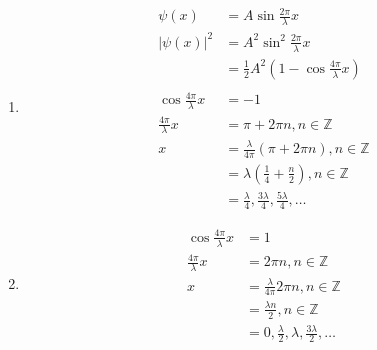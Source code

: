 \documentclass{article}
\begin{document}
\setcounter{subsubsection}{4}
\subsubsection{}

\begin{enumerate}
  \item

        \begin{align*}
          \psi(x)                      & = A \sin \frac{2 \pi}{\lambda} x                                      \\
          |\psi(x)|^2                  & = A^2 \sin^2 \frac{2 \pi}{\lambda} x                                  \\
                                       & = \frac{1}{2} A^2 \left( 1 - \cos \frac{4 \pi}{\lambda} x \right)     \\ \\
          \cos \frac{4 \pi}{\lambda} x & = -1                                                                  \\
          \frac{4 \pi}{\lambda} x      & = \pi + 2 \pi n, n \in \mathbb{Z}                                     \\
          x                            & = \frac{\lambda}{4 \pi} (\pi + 2 \pi n), n \in \mathbb{Z}             \\
                                       & = \lambda \left( \frac{1}{4} + \frac{n}{2} \right), n \in \mathbb{Z}  \\
                                       & = \frac{\lambda}{4}, \frac{3 \lambda}{4}, \frac{5 \lambda}{4}, \ldots
        \end{align*}

  \item

        \begin{align*}
          \cos \frac{4 \pi}{\lambda} x & = 1                                                          \\
          \frac{4 \pi}{\lambda} x      & = 2 \pi n, n \in \mathbb{Z}                                  \\
          x                            & = \frac{\lambda}{4 \pi} 2 \pi n, n \in \mathbb{Z}            \\
                                       & = \frac{\lambda n}{2}, n \in \mathbb{Z}                      \\
                                       & = 0, \frac{\lambda}{2}, \lambda, \frac{3 \lambda}{2}, \ldots
        \end{align*}
\end{enumerate}
\end{document}
